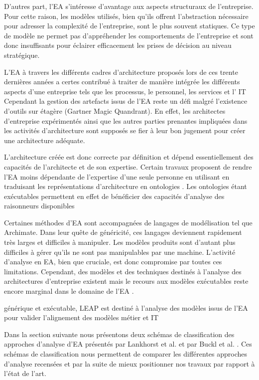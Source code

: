 D'autres part, l'EA s'intéresse d'avantage aux aspects structuraux de
l'entreprise. Pour cette raison, les modèles utilisés, bien qu'ils offrent
l'abstraction nécessaire pour adresser la complexité de l'entreprise, sont le
plus souvent statiques. Ce type de modèle ne permet pas d'appréhender les
comportements de l'entreprise et sont donc insuffisants pour éclairer
efficacement les prises de décision au niveau stratégique.

L'EA à travers les différents cadres d'architecture proposés lors de ces trente
dernières années a certes contribué à traiter de manière intégrée les
différents aspects d'une entreprise tels que les processus, le personnel, les
services et l' IT Cependant la gestion des artefacts issus de l'EA reste un
défi \cite{zachman1997enterprise} malgré l'existence d'outils sur étagère
(Gartner Magic Quandrant). En effet, les architectes d'entreprise expérimentés
ainsi que les autres parties prenantes impliquées dans les activités
d'architecture sont supposés se fier à leur bon jugement pour créer une
architecture adéquate. 

L'architecture créée est donc correcte par définition et dépend essentiellement
des capacités de l'architecte et de son expertise. Certain travaux proposent de
rendre l'EA moins dépendante de l'expertise d'une seule personne en utilisant
en traduisant les représentations d'architecture en ontologies
\cite{sunkle_analyzing_2013}. Les ontologies étant exécutables permettent en
effet de bénéficier des capacités d'analyse des raisonneurs disponibles 

Certaines méthodes d'EA sont accompagnées de langages de modélisation tel que
Archimate. Dans leur quête de généricité, ces langages deviennent rapidement
très larges et difficiles à manipuler. Les modèles produits sont d'autant plus
difficiles à gérer qu'ils ne sont pas manipulables par une machine. L'activité
d'analyse en EA, bien que cruciale, est donc compromise par toutes ces
limitations. Cependant, des modèles et des techniques destinés à l'analyse des
architectures d'entreprise existent mais le recours aux modèles exécutables
reste encore marginal dans le domaine de l'EA \cite{kulkarni2013modelling}.

générique et exécutable, LEAP est destiné à l'analyse des modèles issus de l'EA 
pour valider l'alignement des modèles métier et IT 

Dans la section suivante nous présentons deux schémas de classification des
approches d'analyse d'EA présentés par Lankhorst et al.
\cite{lankhorst2013enterprise} et par Buckl et al. \cite{buckl2009classifying}.
Ces schémas de classification nous permettent de comparer les différentes
approches d'analyse recensées et par la suite de mieux positionner nos travaux
par rapport à l'état de l'art.


